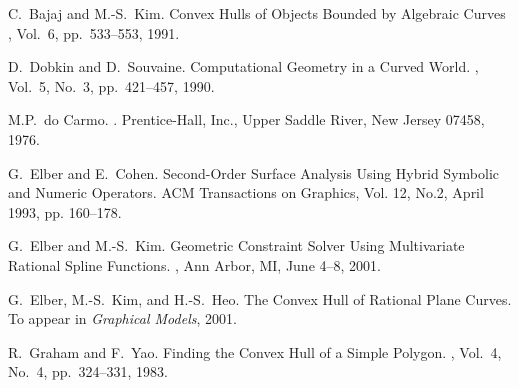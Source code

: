 \documentclass[doublespacing]{elsart}
\begin{document}



\begin{thebibliography}{}


C.~Bajaj and M.-S.~Kim.
\newblock Convex Hulls of Objects Bounded by Algebraic Curves
, Vol.~6, pp.~533--553, 1991.

D.~Dobkin and D.~Souvaine.
\newblock Computational Geometry in a Curved World.
, Vol.~5, No.~3, pp.~421--457, 1990.

M.P.~do Carmo.
.
\newblock Prentice-Hall, Inc., Upper Saddle River, New Jersey 07458, 1976.

G.~Elber and E.~Cohen.
\newblock Second-Order Surface Analysis Using Hybrid Symbolic and
Numeric Operators.
\newblock ACM Transactions on Graphics, Vol. 12, No.2, April 1993, 
pp. 160--178.

G.~Elber and M.-S.~Kim.
\newblock Geometric Constraint Solver
Using Multivariate Rational Spline Functions.
,
Ann Arbor, MI, June 4--8, 2001.

G.~Elber, M.-S.~Kim, and H.-S.~Heo.
\newblock The Convex Hull of Rational Plane Curves.
\newblock To appear in {\em Graphical Models\/}, 2001.

R.~Graham and F.~Yao.
\newblock Finding the Convex Hull of a Simple Polygon.
, Vol.~4, No.~4, pp.~324--331, 1983.


\end{thebibliography}
\end{document}
